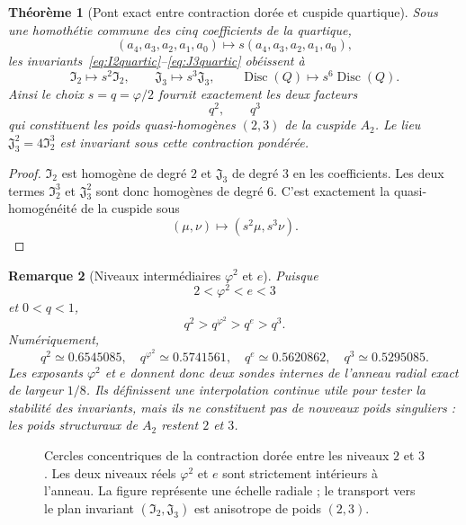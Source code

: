 \documentclass[11pt,a4paper]{article}
\newtheorem{theorem}{Théorème}[section]
\newtheorem{remark}[theorem]{Remarque}
\newcommand{\ph}{\varphi}
\begin{document}
\begin{theorem}[Pont exact entre contraction dorée et cuspide quartique]\label{thm:golden-IJ-A2}
Sous une homothétie commune des cinq coefficients de la quartique,
\[
 (a_4,a_3,a_2,a_1,a_0)\longmapsto s(a_4,a_3,a_2,a_1,a_0),
\]
les invariants~\eqref{eq:I2quartic}--\eqref{eq:J3quartic} obéissent à
\[
 \mathfrak I_2\longmapsto s^2\mathfrak I_2,
 \qquad
 \mathfrak J_3\longmapsto s^3\mathfrak J_3,
 \qquad
 \operatorname{Disc}(Q)\longmapsto s^6\operatorname{Disc}(Q).
\]
Ainsi le choix $s=q=\ph/2$ fournit exactement les deux facteurs
\[
 q^2,\qquad q^3
\]
qui constituent les poids quasi-homogènes $(2,3)$ de la cuspide $A_2$. Le lieu $\mathfrak J_3^2=4\mathfrak I_2^3$ est invariant sous cette contraction pondérée.
\end{theorem}

\begin{proof}
$\mathfrak I_2$ est homogène de degré $2$ et $\mathfrak J_3$ de degré $3$ en les coefficients. Les deux termes $\mathfrak I_2^3$ et $\mathfrak J_3^2$ sont donc homogènes de degré $6$. C'est exactement la quasi-homogénéité de la cuspide sous
\[
 (\mu,\nu)\mapsto(s^2\mu,s^3\nu).
\]
\end{proof}

\begin{remark}[Niveaux intermédiaires $\ph^2$ et $e$]
Puisque
\[
 2<\ph^2<e<3
\]
et $0<q<1$,
\[
 q^2>q^{\ph^2}>q^e>q^3.
\]
Numériquement,
\[
 q^2\simeq0.6545085,\quad
 q^{\ph^2}\simeq0.5741561,\quad
 q^e\simeq0.5620862,\quad
 q^3\simeq0.5295085.
\]
Les exposants $\ph^2$ et $e$ donnent donc deux sondes internes de l'anneau radial exact de largeur $1/8$. Ils définissent une interpolation continue utile pour tester la stabilité des invariants, mais ils ne constituent pas de nouveaux poids singuliers : les poids structuraux de $A_2$ restent $2$ et $3$.
\end{remark}

\begin{figure}[htbp]
\centering
{}
\caption{Cercles concentriques de la contraction dorée entre les niveaux $2$ et $3$. Les deux niveaux réels $\ph^2$ et $e$ sont strictement intérieurs à l'anneau. La figure représente une échelle radiale ; le transport vers le plan invariant $(\mathfrak I_2,\mathfrak J_3)$ est anisotrope de poids $(2,3)$.}
\label{fig:golden-concentric-A2}
\end{figure}
\end{document}
